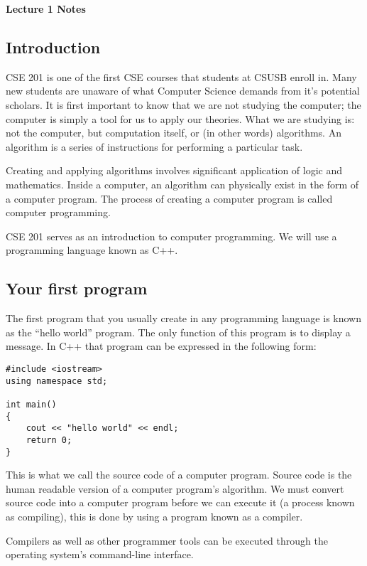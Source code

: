 \documentclass[a4paper,12pt]{article}
\begin{document}
\lstset{frame=single,tabsize=4,basicstyle=\ttfamily}

{\centering \bf \Large
Lecture 1 Notes \\[\baselineskip]
}

\subsection*{Introduction}

CSE 201 is one of the first CSE courses that students at CSUSB enroll in. Many new students are unaware of what Computer Science demands from it's potential scholars. It is first important to know that we are not studying the computer; the computer is simply a tool for us to apply our theories. What we are studying is: not the computer, but computation itself, or (in other words) algorithms. An algorithm is a series of instructions for performing a particular task. 

Creating and applying algorithms involves significant application of logic and mathematics. Inside a computer, an algorithm can physically exist in the form of a computer program. The process of creating a computer program is called computer programming.

CSE 201 serves as an introduction to computer programming. We will use a programming language known as C++.

\subsection*{Your first program}

The first program that you usually create in any programming language is known as the ``hello world'' program. The only function of this program is to display a message. In C++ that program can be expressed in the following form:

\begin{lstlisting}[caption=hello.cpp]
#include <iostream>
using namespace std;

int main()
{
	cout << "hello world" << endl;
	return 0;
}
\end{lstlisting}

This is what we call the source code of a computer program. Source code is the human readable version of a computer program's algorithm. We must convert source code into a computer program before we can execute it (a process known as compiling), this is done by using a program known as a compiler. 

Compilers as well as other programmer tools can be executed through the operating system's command-line interface. 
\end{document}
